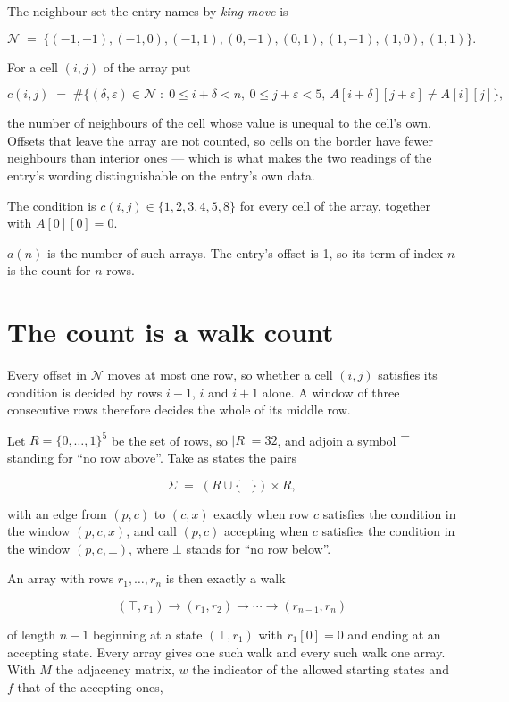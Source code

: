\documentclass[11pt]{article}
\theoremstyle{definition}
\begin{document}
The neighbour set the entry names by {\itshape king-move} is

\[\mathcal{N} \;=\; \{(-1,-1), (-1,0), (-1,1), (0,-1), (0,1), (1,-1), (1,0), (1,1)\}.\]

For a cell $(i,j)$ of the array put

\[c(i,j) \;=\; \#\bigl\{(\delta,\varepsilon)\in\mathcal{N} \;:\; 0\le i+\delta<n,\ 0\le j+\varepsilon<5,\ A[i+\delta][j+\varepsilon] \neq A[i][j]\bigr\},\]

the number of neighbours of the cell whose value is unequal to the cell's own. Offsets that leave the array are not counted, so cells on the border have fewer neighbours than interior ones --- which is what makes the two readings of the entry's wording distinguishable on the entry's own data.

The condition is $c(i,j) \in \{1, 2, 3, 4, 5, 8\}$ for every cell of the array, together with $A[0][0]=0$.

$a(n)$ is the number of such arrays. The entry's offset is 1, so its term of index $n$ is the count for $n$ rows.

\section{The count is a walk count}

Every offset in $\mathcal{N}$ moves at most one row, so whether a cell $(i,j)$ satisfies its condition is decided by rows $i-1$, $i$ and $i+1$ alone. A window of three consecutive rows therefore decides the whole of its middle row.

Let $R = \{0,\dots,1\}^{5}$ be the set of rows, so $|R| = 32$, and adjoin a symbol $\top$ standing for ``no row above''. Take as states the pairs

\[\Sigma \;=\; (R \cup \{\top\}) \times R,\]

with an edge from $(p,c)$ to $(c,x)$ exactly when row $c$ satisfies the condition in the window $(p,c,x)$, and call $(p,c)$ accepting when $c$ satisfies the condition in the window $(p,c,\bot)$, where $\bot$ stands for ``no row below''.

An array with rows $r_1,\dots,r_n$ is then exactly a walk

\[(\top,r_1) \to (r_1,r_2) \to \cdots \to (r_{n-1},r_n)\]

of length $n-1$ beginning at a state $(\top,r_1)$ with $r_1[0]=0$ and ending at an accepting state. Every array gives one such walk and every such walk one array. With $M$ the adjacency matrix, $w$ the indicator of the allowed starting states and $f$ that of the accepting ones,
\end{document}
